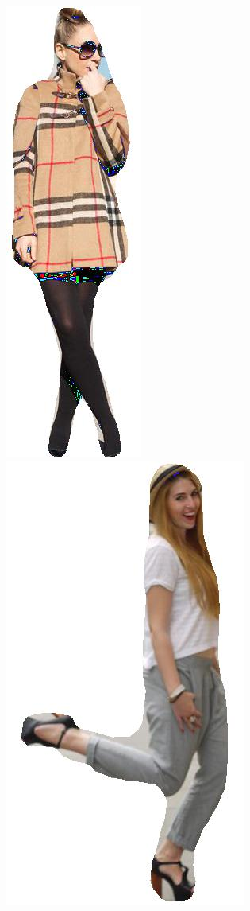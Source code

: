 \documentclass[12pt]{report}
\begin{document}
\begin{figure}
\begin{minipage}[b]{0.3\textwidth}
    \includegraphics[scale=0.5]{images/resultados/299206mask.jpg}
    \includegraphics[scale=0.5]{images/resultados/349322mask.jpg}

\end{minipage}
\end{figure}
\end{document}
